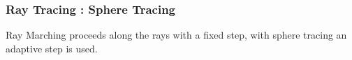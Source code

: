 \documentclass{beamer}
\begin{document}
\begin{frame}
\frametitle{Ray Tracing : Sphere Tracing}
Ray Marching proceeds along the rays with a fixed step, with sphere tracing an adaptive step is used.


\end{frame}






















\end{document}
